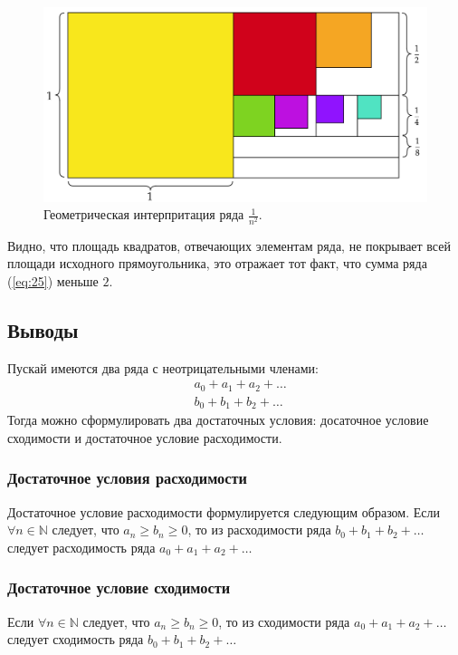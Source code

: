 \documentclass[12pt]{article}
\begin{document}
\begin{figure}[ht]
    \centering
    \includegraphics[width = 1\textwidth]{Лекция 2/fig6.png}
    \caption{Геометрическая интерпритация ряда $\tfrac{1}{n^2}$.}
    \label{fig:6}
\end{figure}
\par
Видно, что площадь квадратов, отвечающих элементам ряда, не покрывает всей площади исходного прямоугольника, это отражает тот факт, что сумма ряда (\ref{eq:25}) меньше $2$.
\subsection{Выводы}
Пускай имеются два ряда с неотрицательными членами:
\begin{equation}
    \begin{split}
        &a_0 + a_1 + a_2 + \ldots\\
        &b_0 + b_1 + b_2 + \ldots
    \end{split}
\end{equation}
Тогда можно сформулировать два достаточных условия: досаточное условие сходимости и достаточное условие расходимости. 
\subsubsection{Достаточное условия расходимости}
Достаточное условие расходимости формулируется следующим образом. Если $\forall n \in \mathbb{N}$ следует, что $a_n \ge b_n \ge 0$, то из расходимости ряда $b_0 + b_1 + b_2 + \ldots$ следует расходимость ряда $a_0 + a_1 + a_2 + \ldots$
\subsubsection{Достаточное условие сходимости}
Если $\forall n \in \mathbb{N}$ следует, что $a_n \ge b_n \ge 0$, то из сходимости ряда $a_0 + a_1 + a_2 + \ldots$ следует сходимость ряда $b_0 + b_1 + b_2 + \ldots$
\end{document}
